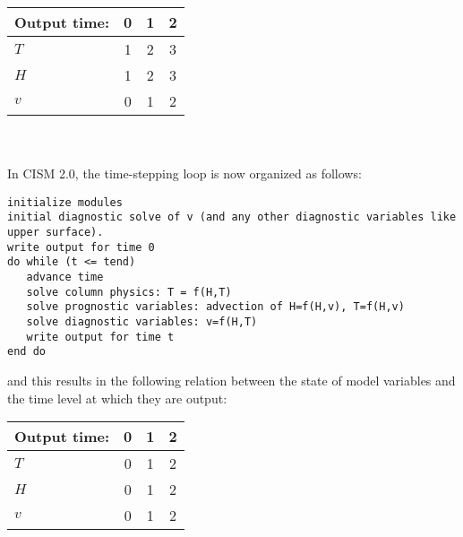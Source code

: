 \begin{tabular}{lccc}
\hline
Output time:  & 0    & 1   & 2  \\
\hline
$T$  &  1                    &  2                    &  3  \\
$H$  &  1                    &  2                    &  3  \\
$v$  &  0                    &  1                    &  2  \\
\hline
\end{tabular}
\\~\\  %

In CISM 2.0, the time-stepping loop is now organized as follows:
\begin{verbatim}
initialize modules
initial diagnostic solve of v (and any other diagnostic variables like upper surface).
write output for time 0
do while (t <= tend)
   advance time
   solve column physics: T = f(H,T) 
   solve prognostic variables: advection of H=f(H,v), T=f(H,v)
   solve diagnostic variables: v=f(H,T)
   write output for time t
end do
\end{verbatim}

\noindent and this results in the following relation between the state of model variables and
the time level at which they are output:

\begin{tabular}{lccc}
\hline
Output time:  & 0    & 1   & 2  \\
\hline
$T$  &  0                    &  1                    &  2  \\
$H$  &  0                    &  1                    &  2  \\
$v$  &  0                    &  1                    &  2  \\
\hline
\end{tabular}


